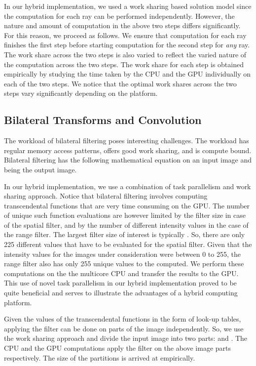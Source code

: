 \documentclass[11pt]{article}
\begin{document}
In our hybrid implementation, we used a work sharing based solution model
since the computation for each ray can be performed independently. However,
the nature and amount of computation in the above two steps differs
significantly. For this reason, we proceed as follows. We ensure that
computation for each ray finishes the first step before starting computation
for  the  second step for {\em any} ray. The work share across the two steps 
is also varied to reflect the varied nature of the computation across the two
steps. The work share for each step is obtained empirically by studying the
time taken by the CPU and the GPU individually on each of the two steps. We
notice that the optimal work shares across the two steps vary significantly 
depending on the platform.



\subsection{Bilateral Transforms and Convolution}
The workload of bilateral filtering poses interesting challenges.  The
workload has regular memory access patterns, offers good work sharing, 
and is compute bound. Bilateral filtering has the following mathematical
equation on an input image  and  being the output image. 

In our hybrid implementation, we use a combination of task parallelism and
work sharing approach. Notice that bilateral filtering involves computing transcendental 
functions that are very time consuming on the GPU. The number of unique such
function evaluations are however limited by the filter size in case of the
spatial filter, and by the number of different intensity values in the case of
the range filter. The largest filter size of interest is typically . So, there are only 225 different values that have to be evaluated for the
spatial filter. Given that the intensity values for the images under
consideration were between 0 to 255, the range filter also has only 255 unique
values to the computed.  We perform these computations on the 
the multicore CPU and transfer the results to the GPU. This use of novel task
parallelism in our hybrid implementation proved to be quite beneficial and
serves to illustrate the advantages of a hybrid computing platform. 

Given the values of the transcendental functions in the form of  look-up
tables, applying the filter can be done on parts of the image independently.
So, we use the work sharing approach and divide the input image  into two
parts:  and . The CPU and the GPU
computations apply the filter on the above image parts respectively. The size
of the partitions is arrived at empirically. 
\end{document}
